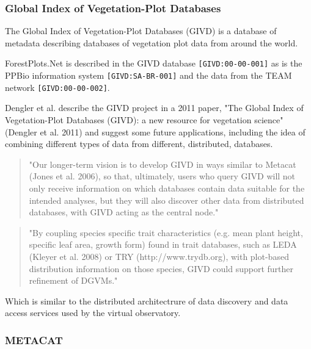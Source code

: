 \documentclass{article}
\begin{document}
\subsubsection{Global Index of Vegetation-Plot Databases}

The Global Index of Vegetation-Plot Databases (GIVD)
is a database of metadata describing databases of vegetation plot data
from around the world.

\noindent
ForestPlots.Net is described in the GIVD database
\texttt{[GIVD:00-00-001]}
as is the PPBio information system
\texttt{[GIVD:SA-BR-001]}	
and the data from the TEAM network
\texttt{[GIVD:00-00-002]}.

Dengler et al. describe the GIVD project in a 2011 paper,
"The Global Index of Vegetation-Plot Databases (GIVD): a new resource for vegetation science"
(Dengler et al. 2011)
and suggest some future applications, including the idea of combining
different types of data from different, distributed, databases.

\begin{quote}
"Our longer-term vision is to develop GIVD in ways similar to Metacat (Jones et
al. 2006), so that, ultimately, users who query GIVD will not only receive
information on which databases contain data suitable for the intended analyses,
but they will also discover other data from distributed databases, with GIVD
acting as the central node."
\end{quote}

\begin{quote}
"By coupling species specific trait characteristics (e.g. mean plant height,
specific leaf area, growth form) found in trait databases, such as LEDA (Kleyer
et al. 2008) or TRY (http://www.trydb.org), with plot-based distribution
information on those species, GIVD could support further refinement of DGVMs."
\end{quote}

Which is similar to the distributed architectrure of data discovery and data
access services used by the virtual observatory.

\subsubsection{METACAT}
\end{document}
